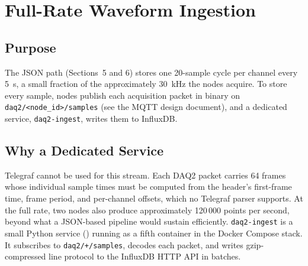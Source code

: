 \section{Full-Rate Waveform Ingestion}
\label{sec:fullrate}

\subsection{Purpose}
The JSON path (Sections~5 and 6) stores one 20-sample cycle per channel every 5~s, a small fraction of the approximately 30~kHz the nodes acquire. To store every sample, nodes publish each acquisition packet in binary on \texttt{daq2/<node\_id>/samples} (see the MQTT design document), and a dedicated service, \texttt{daq2-ingest}, writes them to InfluxDB.

\subsection{Why a Dedicated Service}
Telegraf cannot be used for this stream. Each DAQ2 packet carries 64 frames whose individual sample times must be computed from the header's first-frame time, frame period, and per-channel offsets, which no Telegraf parser supports. At the full rate, two nodes also produce approximately 120\,000 points per second, beyond what a JSON-based pipeline would sustain efficiently. \texttt{daq2-ingest} is a small Python service () running as a fifth container in the Docker Compose stack. It subscribes to \texttt{daq2/+/samples}, decodes each packet, and writes gzip-compressed line protocol to the InfluxDB HTTP API in batches.

